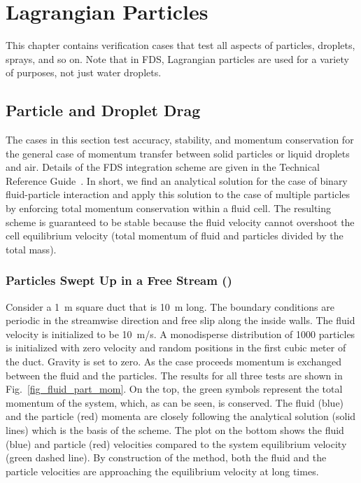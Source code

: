 \documentclass[11pt]{book}
\begin{document}
\chapter{Lagrangian Particles}

This chapter contains verification cases that test all aspects of particles, droplets, sprays, and so on. Note that in FDS, Lagrangian particles are used for a variety of purposes, not just water droplets.

\section{Particle and Droplet Drag}

The cases in this section test accuracy, stability, and momentum conservation for the general case of momentum transfer between solid particles or liquid droplets and air. Details of the FDS integration scheme are given in the Technical Reference Guide~\cite{FDS_Tech_Guide}.  In short, we find an analytical solution for the case of binary fluid-particle interaction and apply this solution to the case of multiple particles by enforcing total momentum conservation within a fluid cell.  The resulting scheme is guaranteed to be stable because the fluid velocity cannot overshoot the cell equilibrium velocity (total momentum of fluid and particles divided by the total mass).


\subsection{Particles Swept Up in a Free Stream (\texorpdfstring{}{fluid\_part\_mom})}

Consider a 1~m square duct that is 10~m long.  The boundary conditions are periodic in the streamwise direction and free slip along the inside walls. The fluid velocity is initialized to be 10~m/s. A monodisperse distribution of 1000 particles is initialized with zero velocity and random positions in the first cubic meter of the duct. Gravity is set to zero. As the case proceeds momentum is exchanged between the fluid and the particles. The results for all three tests are shown in Fig.~\ref{fig_fluid_part_mom}.  On the top, the green symbols represent the total momentum of the system, which, as can be seen, is conserved.  The fluid (blue) and the particle (red) momenta are closely following the analytical solution (solid lines) which is the basis of the scheme.  The plot on the bottom shows the fluid (blue) and particle (red) velocities compared to the system equilibrium velocity (green dashed line).  By construction of the method, both the fluid and the particle velocities are approaching the equilibrium velocity at long times.
\end{document}
